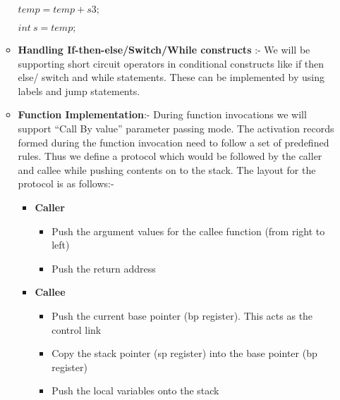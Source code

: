 \documentclass{sigchi}
\begin{document}
\begin{enumerate}
\begin{itemize}
\hspace{1 in}$temp=temp+s3;$

\hspace{1 in}$int\ s=temp;$\\


		\item \textbf{Handling If-then-else/Switch/While constructs }:-
We will be supporting short circuit operators in conditional constructs like if then else/ switch and while statements. These can be implemented by using labels and jump statements.
		\item \textbf{Function Implementation}:- During function invocations we will support “Call By value” parameter passing mode. The activation records formed during the function invocation need to follow a set of predefined rules. Thus we define a protocol which would be followed by the caller and callee while pushing contents on to the stack. The layout for the protocol is as follows:-
        \begin{itemize}
        	\item {\bf Caller}
            \begin{itemize}
			\item Push the argument values for the callee function (from right to left)
			\item Push the return address
            \end{itemize}
			\item {\bf Callee}
            \begin{itemize}
			\item Push the current base pointer (bp register). This acts as the control link
			\item Copy the stack pointer (sp register) into the base pointer (bp register)
			\item Push the local variables onto the stack
            \end{itemize}
        	
    	\end{itemize}

    \end{itemize}
\end{enumerate}
\end{document}
